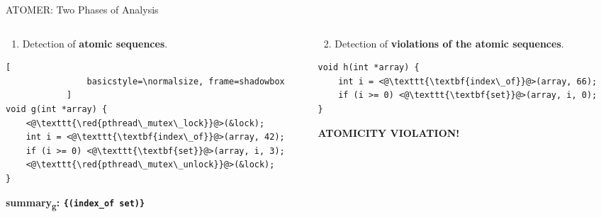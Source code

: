 \documentclass[10pt, usenames, dvipsnames, aspectratio=169]{beamer}
\newcommand{\red}[1]{\textcolor{red}{\textbf{#1}}}
\begin{document}
\begin{frame}[fragile]{ATOMER: Two Phases of Analysis}
    \large

    \begin{columns}[t]
        \begin{column}{0.5 \linewidth}
            \centering

            \begin{enumerate}
                \item
                    Detection of \alert{\textbf{atomic sequences}}.
            \end{enumerate}

            \begin{lstlisting}[
                basicstyle=\normalsize, frame=shadowbox
            ]
void g(int *array) {
    <@\texttt{\red{pthread\_mutex\_lock}}@>(&lock);
    int i = <@\texttt{\textbf{index\_of}}@>(array, 42);
    if (i >= 0) <@\texttt{\textbf{set}}@>(array, i, 3);
    <@\texttt{\red{pthread\_mutex\_unlock}}@>(&lock);
}
            \end{lstlisting}

            \alert{\textbf{
                summary\textsubscript{g}:
                \texttt{\{(index\_of set)\}}
            }}
        \end{column}

        \begin{column}{0.5 \linewidth}
            \centering

            \begin{enumerate}
                \setcounter{enumi}{1}

                \item
                    Detection of \alert{\textbf{violations of the
                    atomic sequences}}.
            \end{enumerate}

            \begin{lstlisting}[basicstyle=\normalsize, frame=shadowbox]
void h(int *array) {
    int i = <@\texttt{\textbf{index\_of}}@>(array, 66);
    if (i >= 0) <@\texttt{\textbf{set}}@>(array, i, 0);
}
            \end{lstlisting}

            \alert{\textbf{ATOMICITY VIOLATION!}}
        \end{column}
    \end{columns}
\end{frame}
\end{document}
